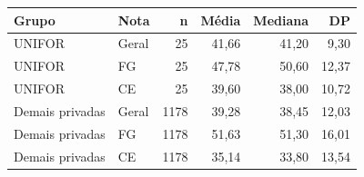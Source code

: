 \begin{tabular}{llrrrr}
\toprule
Grupo & Nota & n & Média & Mediana & DP \\
\midrule
UNIFOR & Geral & 25 & 41,66 & 41,20 & 9,30 \\
UNIFOR & FG & 25 & 47,78 & 50,60 & 12,37 \\
UNIFOR & CE & 25 & 39,60 & 38,00 & 10,72 \\
Demais privadas & Geral & 1178 & 39,28 & 38,45 & 12,03 \\
Demais privadas & FG & 1178 & 51,63 & 51,30 & 16,01 \\
Demais privadas & CE & 1178 & 35,14 & 33,80 & 13,54 \\
\bottomrule
\end{tabular}
